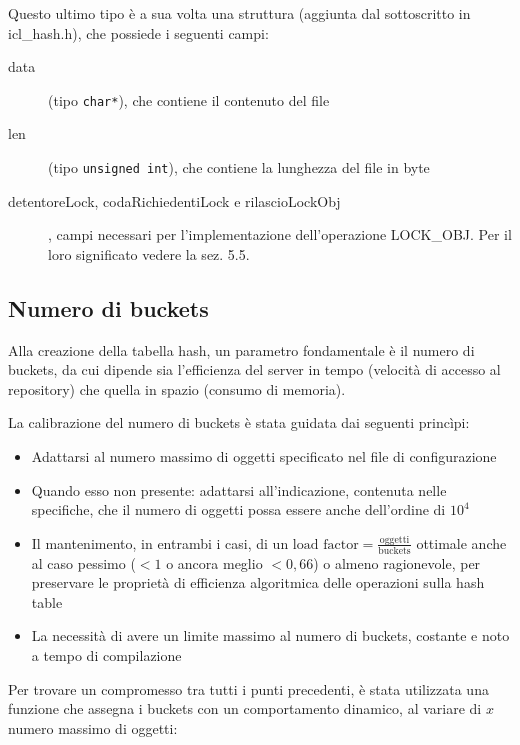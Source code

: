 \documentclass[a4paper,12pt]{article}
\begin{document}
Questo ultimo tipo è a sua volta una struttura (aggiunta dal sottoscritto in icl\_hash.h), che possiede i seguenti campi:

\begin{description}
 \item[data] (tipo \texttt{char*}), che contiene il contenuto del file
 \item[len] (tipo \texttt{unsigned int}), che contiene la lunghezza del file in byte
 \item[detentoreLock, codaRichiedentiLock e rilascioLockObj], campi necessari per l'implementazione dell'operazione LOCK\_OBJ. Per il loro significato vedere la sez. 5.5.
\end{description}

\subsection{ Numero di buckets }

Alla creazione della tabella hash, un parametro fondamentale è il numero di buckets, da cui dipende sia l'efficienza del server in tempo (velocità di accesso al repository) che quella in spazio (consumo di memoria).

La calibrazione del numero di buckets è stata guidata dai seguenti princìpi:
\begin{itemize}
 \item Adattarsi al numero massimo di oggetti specificato nel file di configurazione
 \item Quando esso non presente: adattarsi all'indicazione, contenuta nelle specifiche, che il numero di oggetti possa essere anche dell'ordine di $10^4$
 \item Il mantenimento, in entrambi i casi, di un $\text{load factor} = \frac{\text{oggetti}}{\text{buckets}}$ ottimale anche al caso pessimo ($< 1$ o ancora meglio $< 0,66$) o almeno ragionevole, per preservare le proprietà di efficienza algoritmica delle operazioni sulla hash table
 \item La necessità di avere un limite massimo al numero di buckets, costante e noto a tempo di compilazione                                                                                                  
\end{itemize}

Per trovare un compromesso tra tutti i punti precedenti, è stata utilizzata una funzione che assegna i buckets con un comportamento dinamico, al variare di $x$ numero massimo di oggetti:
\end{document}
